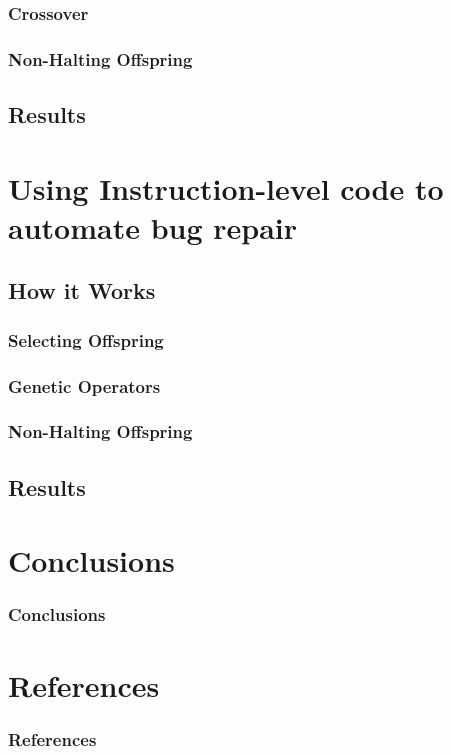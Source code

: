 \documentclass{beamer}
\begin{document}
\begin{frame}
\begin{columns}
  
  \end{columns}
\end{frame}

\begin{frame}
  \frametitle{Crossover}
\end{frame}

\begin{frame}
\frametitle{Non-Halting Offspring}
\end{frame}

\subsection[Results]{Results}


\section[Evolving Assembly]{Using Instruction-level code to automate bug repair}

\subsection{How it Works}
\begin{frame}
  \frametitle{Selecting Offspring}
\end{frame}

\begin{frame}
  \frametitle{Genetic Operators}
\end{frame}

\begin{frame}
  \frametitle{Non-Halting Offspring}
\end{frame}

\subsection[Results]{Results}

\section[Conclusions]{Conclusions}

\begin{frame}
\frametitle{Conclusions}
\end{frame}

\section*{References}

\begin{frame} 
	\frametitle{References} 
	
	\begin{thebibliography}{lskdjf}
  	\end{thebibliography}
\end{frame} 
\end{document}
